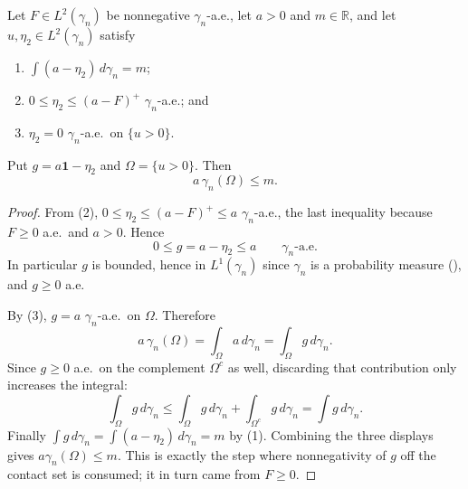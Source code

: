 \begin{lemma}
Let $F \in L^2(\gamma_n)$ be nonnegative $\gamma_n$-a.e., let $a > 0$ and
$m \in \mathbb{R}$, and let $u, \eta_2 \in L^2(\gamma_n)$ satisfy
\begin{enumerate}
\item $\int (a - \eta_2)\, d\gamma_n = m$;
\item $0 \leq \eta_2 \leq (a-F)^+$ $\gamma_n$-a.e.; and
\item $\eta_2 = 0$ $\gamma_n$-a.e.\ on $\{u > 0\}$.
\end{enumerate}
Put $g = a\mathbf{1} - \eta_2$ and $\Omega = \{u > 0\}$.  Then
\[
  a\,\gamma_n(\Omega) \leq m .
\]
\end{lemma}
\begin{proof}
From (2), $0 \leq \eta_2 \leq (a-F)^+ \leq a$ $\gamma_n$-a.e., the last inequality
because $F \geq 0$ a.e.\ and $a > 0$.  Hence
\[
  0 \leq g = a - \eta_2 \leq a \qquad \gamma_n\text{-a.e.}
\]
In particular $g$ is bounded, hence in $L^1(\gamma_n)$ since $\gamma_n$ is a
probability measure (), and $g \geq 0$ a.e.

By (3), $g = a$ $\gamma_n$-a.e.\ on $\Omega$.  Therefore
\[
  a\,\gamma_n(\Omega)
    = \int_{\Omega} a \, d\gamma_n
    = \int_{\Omega} g \, d\gamma_n .
\]
Since $g \geq 0$ a.e.\ on the complement $\Omega^c$ as well, discarding that
contribution only increases the integral:
\[
  \int_\Omega g \, d\gamma_n
    \leq \int_\Omega g\, d\gamma_n + \int_{\Omega^c} g \, d\gamma_n
    = \int g \, d\gamma_n .
\]
Finally $\int g \, d\gamma_n = \int (a - \eta_2) \, d\gamma_n = m$ by (1).
Combining the three displays gives $a\gamma_n(\Omega) \leq m$.  This is exactly
the step where nonnegativity of $g$ off the contact set is consumed; it in turn
came from $F \geq 0$.
\end{proof}
